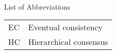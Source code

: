 

\renewcommand{\baselinestretch}{1}
\small\normalsize
\hbox{\ }

\vspace{-4em}

\begin{center}
\large{List of Abbreviations}
\end{center}

\vspace{3pt}

\begin{supertabular}{ll}
EC & Eventual consistency \\
HC & Hierarchical consensus \\
\end{supertabular}
